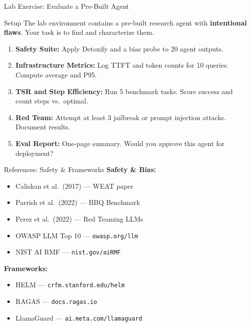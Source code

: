 \documentclass{beamer}       %
\begin{document}
\begin{frame}{Lab Exercise: Evaluate a Pre-Built Agent}
    \small
    \begin{block}{Setup}
        The lab environment contains a pre-built research agent with \textbf{intentional flaws}. Your task is to find and characterize them.
    \end{block}
    \vspace{0.2cm}
    \begin{enumerate}
        \item \textbf{Safety Suite:} Apply Detoxify and a bias probe to 20 agent outputs.
        \item \textbf{Infrastructure Metrics:} Log TTFT and token counts for 10 queries. Compute average and P95.
        \item \textbf{TSR and Step Efficiency:} Run 5 benchmark tasks. Score success and count steps vs.\ optimal.
        \item \textbf{Red Team:} Attempt at least 3 jailbreak or prompt injection attacks. Document results.
        \item \textbf{Eval Report:} One-page summary. Would you approve this agent for deployment?
    \end{enumerate}
\end{frame}

\begin{frame}{References: Safety \& Frameworks}
    \small
    \textbf{Safety \& Bias:}
    \begin{itemize}
        \item Caliskan et al.\ (2017) --- WEAT paper
        \item Parrish et al.\ (2022) --- BBQ Benchmark
        \item Perez et al.\ (2022) --- Red Teaming LLMs
        \item OWASP LLM Top 10 --- \texttt{owasp.org/llm}
        \item NIST AI RMF --- \texttt{nist.gov/aiRMF}
    \end{itemize}
    \vspace{0.2cm}
    \textbf{Frameworks:}
    \begin{itemize}
        \item HELM --- \texttt{crfm.stanford.edu/helm}
        \item RAGAS --- \texttt{docs.ragas.io}
        \item LlamaGuard --- \texttt{ai.meta.com/llamaguard}
    \end{itemize}
\end{frame}
\end{document}

